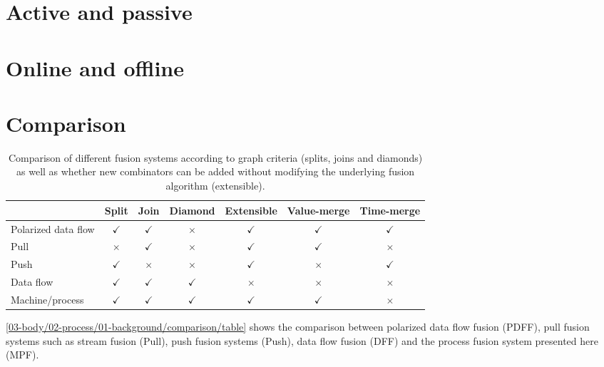 \section{Active and passive}

\section{Online and offline}

\section{Comparison}

\begin{table}
\begin{center}
\begin{tabular}{|l||c|c|c|c|c|c|}
\hline
 & Split & Join & Diamond & Extensible & Value-merge & Time-merge \\
\hline
\hline
Polarized data flow
  & $\checkmark$ & $\checkmark$ & $\times$ & $\checkmark$ & $\checkmark$& $\checkmark$ \\
Pull
  & $\times$ & $\checkmark$ & $\times$ & $\checkmark$ & $\checkmark$ & $\times$ \\
Push
  & $\checkmark$ & $\times$ & $\times$ & $\checkmark$ & $\times$ & $\checkmark$ \\
Data flow
  & $\checkmark$ & $\checkmark$ & $\checkmark$ & $\times$ & $\times$ & $\times$ \\
Machine/process
  & $\checkmark$ & $\checkmark$ & $\checkmark$ & $\checkmark$ & $\checkmark$ & $\times$ \\
\hline
\end{tabular}
\end{center}
\caption[Comparison between fusion systems]{Comparison of different fusion systems according to graph criteria (splits, joins and diamonds) as well as whether new combinators can be added without modifying the underlying fusion algorithm (extensible).}
\label{03-body/02-process/01-background/comparison/table}
\end{table}

\autoref{03-body/02-process/01-background/comparison/table} shows the comparison between polarized data flow fusion (PDFF), pull fusion systems such as stream fusion (Pull), push fusion systems (Push), data flow fusion (DFF) and the process fusion system presented here (MPF).

